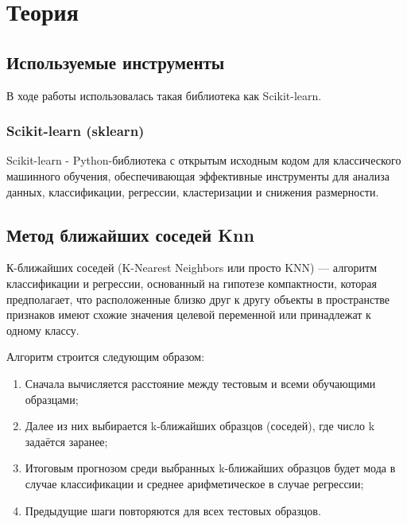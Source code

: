 \chapter{Теория}

\section{Используемые инструменты}
В ходе работы использовалась такая библиотека как Scikit-learn. \\

\subsection{Scikit-learn (sklearn)}
Scikit-learn - Python-библиотека с открытым исходным кодом для классического машинного 
обучения, обеспечивающая эффективные инструменты для анализа данных, классификации, 
регрессии, кластеризации и снижения размерности.

\section{Метод ближайших соседей Knn}

К-ближайших соседей (K-Nearest Neighbors или просто KNN) — алгоритм классификации и регрессии, основанный на гипотезе компактности,
которая предполагает, что расположенные близко друг к другу объекты в пространстве признаков имеют схожие значения целевой 
переменной или принадлежат к одному классу.


Алгоритм строится следующим образом:

\begin{enumerate}
    \item Сначала вычисляется расстояние между тестовым и всеми обучающими образцами;
    \item Далее из них выбирается k-ближайших образцов (соседей), где число k задаётся заранее;
    \item Итоговым прогнозом среди выбранных k-ближайших образцов будет мода в случае классификации и среднее арифметическое в случае регрессии;
    \item Предыдущие шаги повторяются для всех тестовых образцов.
\end{enumerate}



\endinput